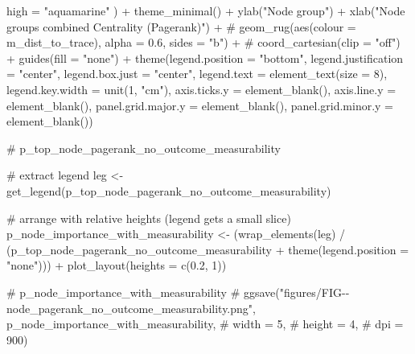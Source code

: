 \documentclass[
  letterpaper,
  DIV=11,
  numbers=noendperiod]{scrartcl}
\newenvironment{Shaded}{\begin{snugshade}}{\end{snugshade}}
\newcommand{\AttributeTok}[1]{\textcolor[rgb]{0.40,0.45,0.13}{#1}}
\newcommand{\CommentTok}[1]{\textcolor[rgb]{0.37,0.37,0.37}{#1}}
\newcommand{\DecValTok}[1]{\textcolor[rgb]{0.68,0.00,0.00}{#1}}
\newcommand{\FloatTok}[1]{\textcolor[rgb]{0.68,0.00,0.00}{#1}}
\newcommand{\FunctionTok}[1]{\textcolor[rgb]{0.28,0.35,0.67}{#1}}
\newcommand{\NormalTok}[1]{\textcolor[rgb]{0.00,0.23,0.31}{#1}}
\newcommand{\OtherTok}[1]{\textcolor[rgb]{0.00,0.23,0.31}{#1}}
\newcommand{\SpecialCharTok}[1]{\textcolor[rgb]{0.37,0.37,0.37}{#1}}
\newcommand{\StringTok}[1]{\textcolor[rgb]{0.13,0.47,0.30}{#1}}
\begin{document}
\begin{Shaded}
\begin{Highlighting}[]
        \AttributeTok{high =} \StringTok{"aquamarine"}
\NormalTok{        ) }\SpecialCharTok{+}
    \FunctionTok{theme\_minimal}\NormalTok{() }\SpecialCharTok{+}
    \FunctionTok{ylab}\NormalTok{(}\StringTok{"Node group"}\NormalTok{) }\SpecialCharTok{+}
    \FunctionTok{xlab}\NormalTok{(}\StringTok{"Node groups combined Centrality (Pagerank)"}\NormalTok{) }\SpecialCharTok{+}
    \CommentTok{\# geom\_rug(aes(colour = m\_dist\_to\_trace), alpha = 0.6, sides = "b") +}
    \CommentTok{\# coord\_cartesian(clip = "off") +}
    \FunctionTok{guides}\NormalTok{(}\AttributeTok{fill =} \StringTok{"none"}\NormalTok{) }\SpecialCharTok{+}
    \FunctionTok{theme}\NormalTok{(}\AttributeTok{legend.position =} \StringTok{"bottom"}\NormalTok{,}
          \AttributeTok{legend.justification =} \StringTok{"center"}\NormalTok{,}
    \AttributeTok{legend.box.just =} \StringTok{"center"}\NormalTok{,}
          \AttributeTok{legend.text  =} \FunctionTok{element\_text}\NormalTok{(}\AttributeTok{size =} \DecValTok{8}\NormalTok{),}
          \AttributeTok{legend.key.width =} \FunctionTok{unit}\NormalTok{(}\DecValTok{1}\NormalTok{, }\StringTok{"cm"}\NormalTok{),}
          \AttributeTok{axis.ticks.y =} \FunctionTok{element\_blank}\NormalTok{(),}
          \AttributeTok{axis.line.y =} \FunctionTok{element\_blank}\NormalTok{(),}
          \AttributeTok{panel.grid.major.y =} \FunctionTok{element\_blank}\NormalTok{(),}
          \AttributeTok{panel.grid.minor.y =} \FunctionTok{element\_blank}\NormalTok{())}

\CommentTok{\# p\_top\_node\_pagerank\_no\_outcome\_measurability}

\CommentTok{\# extract legend}
\NormalTok{leg }\OtherTok{\textless{}{-}} \FunctionTok{get\_legend}\NormalTok{(p\_top\_node\_pagerank\_no\_outcome\_measurability)}

\CommentTok{\# arrange with relative heights (legend gets a small slice)}
\NormalTok{p\_node\_importance\_with\_measurability }\OtherTok{\textless{}{-}}\NormalTok{ (}\FunctionTok{wrap\_elements}\NormalTok{(leg) }\SpecialCharTok{/}
\NormalTok{    (p\_top\_node\_pagerank\_no\_outcome\_measurability }\SpecialCharTok{+} \FunctionTok{theme}\NormalTok{(}\AttributeTok{legend.position =} \StringTok{"none"}\NormalTok{))) }\SpecialCharTok{+}
  \FunctionTok{plot\_layout}\NormalTok{(}\AttributeTok{heights =} \FunctionTok{c}\NormalTok{(}\FloatTok{0.2}\NormalTok{, }\DecValTok{1}\NormalTok{))}

\CommentTok{\# p\_node\_importance\_with\_measurability}
\CommentTok{\# ggsave("figures/FIG{-}{-}node\_pagerank\_no\_outcome\_measurability.png", p\_node\_importance\_with\_measurability,}
\CommentTok{\#        width = 5,}
\CommentTok{\#        height = 4,}
\CommentTok{\#        dpi = 900)}
\end{Highlighting}
\end{Shaded}
\end{document}
